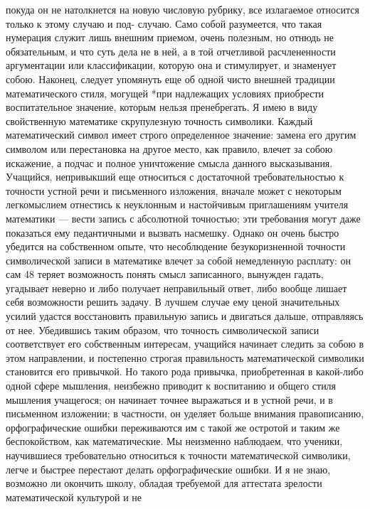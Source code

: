\documentclass[12pt, a4paper, openany]{book}
\begin{document}
покуда он не натолкнется на новую числовую рубрику, 
все излагаемое относится только к этому случаю и под- 
случаю. Само собой разумеется, что такая нумерация  
служит лишь внешним приемом, очень полезным, но отнюдь 
не обязательным, и что суть дела не в ней, а в той  
отчетливой расчлененности аргументации или классификации, 
которую она и стимулирует, и знаменует собою. 
Наконец, следует упомянуть еще об одной чисто  
внешней традиции математического стиля, могущей *при  
надлежащих условиях приобрести воспитательное значение, 
которым нельзя пренебрегать. Я имею в виду  
свойственную математике скрупулезную точность символики.  
Каждый математический символ имеет строго определенное 
значение: замена его другим символом или перестановка 
на другое место, как правило, влечет за собою искажение, 
а подчас и полное уничтожение смысла данного  
высказывания. Учащийся, непривыкший еще относиться с  
достаточной требовательностью к точности устной речи и  
письменного изложения, вначале может с некоторым  
легкомыслием отнестись к неуклонным и настойчивым  
приглашениям учителя математики — вести запись с абсолютной 
точностью; эти требования могут даже показаться ему 
педантичными и вызвать насмешку. Однако он очень 
быстро убедится на собственном опыте, что несоблюдение 
безукоризненной точности символической записи в  
математике влечет за собой немедленную расплату: он сам 
48 
теряет возможность понять смысл записанного, вынужден 
гадать, угадывает неверно и либо получает неправильный 
ответ, либо вообще лишает себя возможности решить  
задачу. В лучшем случае ему ценой значительных усилий 
удастся восстановить правильную запись и двигаться 
дальше, отправляясь от нее. 
Убедившись таким образом, что точность  
символической записи соответствует его собственным интересам, 
учащийся начинает следить за собою в этом направлении, 
и постепенно строгая правильность математической  
символики становится его привычкой. Но такого рода  
привычка, приобретенная в какой-либо одной сфере  
мышления, неизбежно приводит к воспитанию и общего стиля 
мышления учащегося; он начинает точнее выражаться 
и в устной речи, и в письменном изложении; в частности, 
он уделяет больше внимания правописанию,  
орфографические ошибки переживаются им с такой же остротой и  
таким же беспокойством, как математические. Мы неизменно 
наблюдаем, что ученики, научившиеся требовательно  
относиться к точности математической символики, легче и 
быстрее перестают делать орфографические ошибки. И я 
не знаю, возможно ли окончить школу, обладая требуемой 
для аттестата зрелости математической культурой и не 
\end{document}
